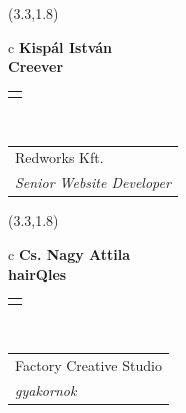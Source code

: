 \documentclass[11pt]{article}
\begin{document}
\makebox(3.3,1.8){
  \renewcommand\arraystretch{1.3}
  \begin{tabular}[c]{c}
    \hspace{8.5mm}
    \LARGE\bf{ Kispál István }\\
    \hspace{8.5mm}
    \Large{ Creever }\\
    \renewcommand\arraystretch{3}
    \begin{tabular}[c]{c}
      \centering
      \fontfamily{phv}\selectfont{
        \textbf{
          \textsc{
            \scriptsize{
            \color{Dark}{ Ismerkedő }\color{Bright}{ Webmester }\color{Bright}{ Sminkmester }\color{Bright}{ Programozó }
            }
          }
        }
      }
    \end{tabular}
    \\
    \renewcommand\arraystretch{1}
    \begin{tabular}{p{3.3in}}
      \hspace{.7cm}Redworks Kft.\\
      \hspace{.7cm}\emph{ Senior Website Developer }\\
    \end{tabular}
  \end{tabular}
}

\makebox(3.3,1.8){
  \renewcommand\arraystretch{1.3}
  \begin{tabular}[c]{c}
    \hspace{8.5mm}
    \LARGE\bf{ Cs. Nagy Attila }\\
    \hspace{8.5mm}
    \Large{ hairQles }\\
    \renewcommand\arraystretch{3}
    \begin{tabular}[c]{c}
      \centering
      \fontfamily{phv}\selectfont{
        \textbf{
          \textsc{
            \scriptsize{
            \color{Bright}{ Ismerkedő }\color{Bright}{ Webmester }\color{Bright}{ Sminkmester }\color{Dark}{ Programozó }
            }
          }
        }
      }
    \end{tabular}
    \\
    \renewcommand\arraystretch{1}
    \begin{tabular}{p{3.3in}}
      \hspace{.7cm}Factory Creative Studio\\
      \hspace{.7cm}\emph{ gyakornok }\\
    \end{tabular}
  \end{tabular}
}
\end{document}
